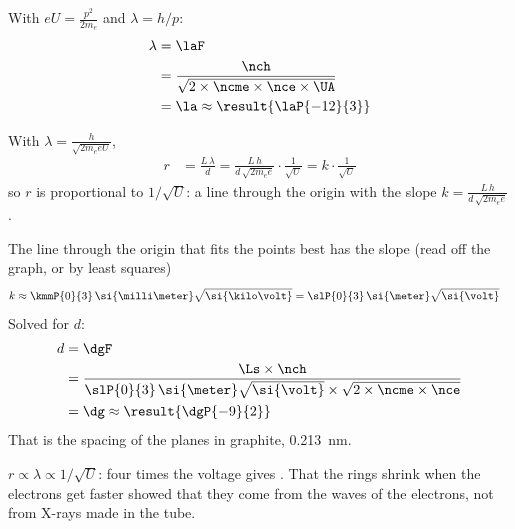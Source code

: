 \begin{abcliste}
\abc With $e U = \frac{p^2}{2 m_e}$ and $\lambda = h/p$:
\begin{align}
 \lambda &= \laF \\
   &= \frac{\nch}{\sqrt{2\times\ncme\times\nce\times\UA}} \\
   &= \la \approx \result{\laP{-12}{3}}
\end{align}

\abc With $\lambda = \frac{h}{\sqrt{2 m_e e U}}$,
\begin{align}
 r &= \frac{L\,\lambda}{d} = \frac{L\,h}{d\,\sqrt{2 m_e e}}\cdot\frac{1}{\sqrt{U}} = k\cdot\frac{1}{\sqrt{U}}
\end{align}
so $r$ is proportional to $1/\sqrt{U}$: a line through the origin with the slope $k = \frac{L\,h}{d\,\sqrt{2 m_e e}}$.

\begin{center}
\end{center}

The line through the origin that fits the points best has the slope (read off the graph, or by least squares)
\begin{align}
 k &\approx \kmmP{0}{3}\,\si{\milli\meter}\sqrt{\si{\kilo\volt}} = \slP{0}{3}\,\si{\meter}\sqrt{\si{\volt}}
\end{align}
Solved for $d$:
\begin{align}
 d &= \dgF \\
   &= \frac{\Ls\times\nch}{\slP{0}{3}\,\si{\meter}\sqrt{\si{\volt}}\times\sqrt{2\times\ncme\times\nce}} \\
   &= \dg \approx \result{\dgP{-9}{2}}
\end{align}
That is the spacing of the planes in graphite, \SI{0.213}{\nano\meter}.

\abc $r \propto \lambda \propto 1/\sqrt{U}$: four times the voltage gives . That the rings shrink when the electrons get faster showed that they come from the waves of the electrons, not from X-rays made in the tube.
\end{abcliste}
